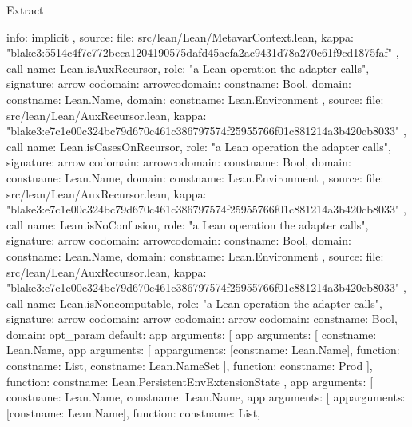 \begin{lexlean}{Extract}
\begin{toolingmodule}
{{{        info: implicit
      },
      source: {
        file: src/lean/Lean/MetavarContext.lean,
        kappa: "blake3:5514c4f7e772beca1204190575dafd45acfa2ac9431d78a270e61f9cd1875faf"
      }
    },
    call{
      name: Lean.isAuxRecursor,
      role: "a Lean operation the adapter calls",
      signature: arrow{
        codomain: arrow{codomain: const{name: Bool}, domain: const{name: Lean.Name}},
        domain: const{name: Lean.Environment}
      },
      source: {
        file: src/lean/Lean/AuxRecursor.lean,
        kappa: "blake3:e7c1e00c324bc79d670c461c386797574f25955766f01c881214a3b420cb8033"
      }
    },
    call{
      name: Lean.isCasesOnRecursor,
      role: "a Lean operation the adapter calls",
      signature: arrow{
        codomain: arrow{codomain: const{name: Bool}, domain: const{name: Lean.Name}},
        domain: const{name: Lean.Environment}
      },
      source: {
        file: src/lean/Lean/AuxRecursor.lean,
        kappa: "blake3:e7c1e00c324bc79d670c461c386797574f25955766f01c881214a3b420cb8033"
      }
    },
    call{
      name: Lean.isNoConfusion,
      role: "a Lean operation the adapter calls",
      signature: arrow{
        codomain: arrow{codomain: const{name: Bool}, domain: const{name: Lean.Name}},
        domain: const{name: Lean.Environment}
      },
      source: {
        file: src/lean/Lean/AuxRecursor.lean,
        kappa: "blake3:e7c1e00c324bc79d670c461c386797574f25955766f01c881214a3b420cb8033"
      }
    },
    call{
      name: Lean.isNoncomputable,
      role: "a Lean operation the adapter calls",
      signature: arrow{
        codomain: arrow{
          codomain: arrow{
            codomain: const{name: Bool},
            domain: opt_param{
              default: app{
                arguments: [
                  app{
                    arguments: [
                      const{name: Lean.Name},
                      app{
                        arguments: [
                          app{arguments: [const{name: Lean.Name}], function: const{name: List}},
                          const{name: Lean.NameSet}
                        ],
                        function: const{name: Prod}
                      }
                    ],
                    function: const{name: Lean.PersistentEnvExtensionState}
                  },
                  app{
                    arguments: [
                      const{name: Lean.Name},
                      const{name: Lean.Name},
                      app{
                        arguments: [
                          app{arguments: [const{name: Lean.Name}], function: const{name: List}},
}}}}}}}}}
\end{toolingmodule}
\end{lexlean}
